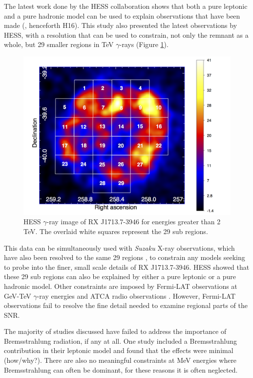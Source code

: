 \documentclass[12pt,a4paper]{article}
\begin{document}
The latest work done by the HESS collaboration shows that both a pure leptonic and a pure hadronic model can be used to explain observations that have been made (\cite{2018A&A...612A...6H}, henceforth H16). This study also presented the latest observations by HESS, with a resolution that can be used to constrain, not only the remnant as a whole, but 29 smaller regions in TeV $\gamma$-rays (Figure \ref{fig:hesssubregions}).
\begin{figure}[H]
	\centering
	\includegraphics[width=0.7\linewidth, height=0.34\textheight]{HESS_subregions}
	\caption{HESS $\gamma$-ray image of RX J1713.7-3946 for energies greater than 2 TeV. The overlaid white squares represent the 29 sub regions.}
	\label{fig:hesssubregions}
\end{figure}
This data can be simultaneously used with \textit{Suzaku} X-ray observations, which have also been resolved to the same 29 regions \citep{2008ApJ...685..988T}, to constrain any models seeking to probe into the finer, small scale details of RX J1713.7-3946. HESS showed that these 29 sub regions can also be explained by either a pure leptonic or a pure hadronic model. Other constraints are imposed by Fermi-LAT observations at GeV-TeV $\gamma$-ray energies and ATCA radio observations \citep{2004ApJ...602..271L}. However, Fermi-LAT observations fail to resolve the fine detail needed to examine regional parts of the SNR.



The majority of studies discussed have failed to address the importance of Bremsstrahlung radiation, if any at all. One study included a Bremsstrahlung contribution in their leptonic model and found that the effects were minimal \citep{2012ApJ...751...65F} (how/why?). There are also no meaningful constraints at MeV energies where Bremsstrahlung can often be dominant, for these reasons it is often neglected.




\end{document}
